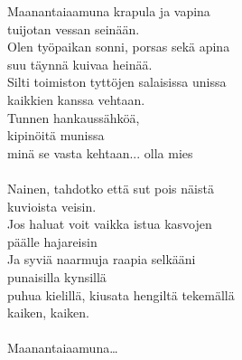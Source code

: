 
        Maanantaiaamuna krapula ja vapina \\
        tuijotan vessan seinään. \\
        Olen työpaikan sonni, porsas sekä apina \\
        suu täynnä kuivaa heinää. \\
        Silti toimiston tyttöjen salaisissa unissa \\
        kaikkien kanssa vehtaan. \\
        Tunnen hankaussähköä, \\
        kipinöitä munissa \\
        minä se vasta kehtaan... olla mies \\
\hspace{10mm} \\
        Nainen, tahdotko että sut pois näistä \\
        kuvioista veisin. \\
        Jos haluat voit vaikka istua kasvojen \\
        päälle hajareisin \\
        Ja syviä naarmuja raapia selkääni \\
        punaisilla kynsillä \\
        puhua kielillä, kiusata hengiltä tekemällä \\
        kaiken, kaiken. \\
\hspace{10mm} \\
        Maanantaiaamuna… \\
